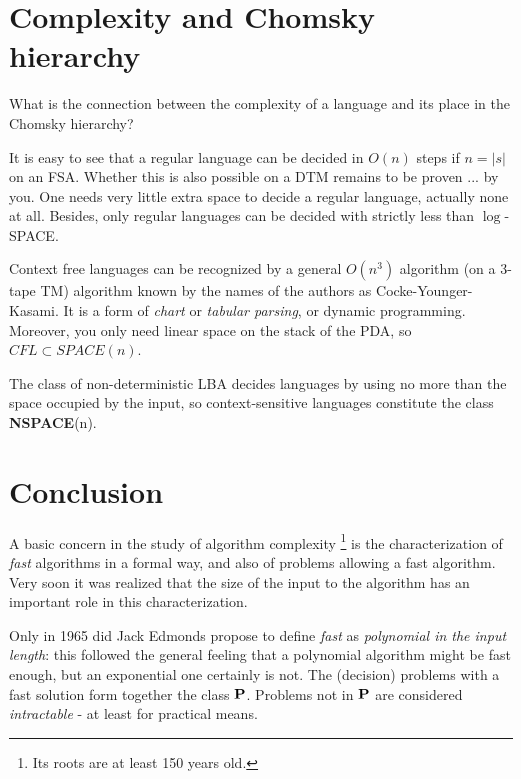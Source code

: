 \section{Complexity and Chomsky hierarchy}

What is the connection between the complexity of a language and its
place in the Chomsky hierarchy?

It is easy to see that a regular language can be decided in $O(n)$
steps if $n = |s|$ on an FSA. Whether this is also possible on a DTM
remains to be proven ... by you. One needs very little extra space to
decide a regular language, actually none at all. Besides, only regular
languages can be decided with strictly less than $\log$-SPACE.

Context free languages can be recognized by a general $O(n^3)$
algorithm (on a 3-tape TM) algorithm known by the names of the authors
as Cocke-Younger-Kasami. It is a form of {\em chart} or {\em tabular
  parsing}, or dynamic programming. Moreover, you only need linear space on the stack of the PDA, so $CFL \subset SPACE(n)$.

The class of non-deterministic LBA decides languages by using no more
than the space occupied by the input, so context-sensitive languages
constitute the class {\bf NSPACE}(n).


\section{Conclusion}

A basic concern in the study of algorithm complexity \footnote{Its
  roots are at least 150 years old.} is the characterization of {\em
  fast} algorithms in a formal way, and also of problems allowing a
fast algorithm. Very soon it was realized that the size of the input
to the algorithm has an important role in this characterization.

Only in 1965 did Jack Edmonds propose to define {\em fast} as {\em
  polynomial in the input length}: this followed the general feeling
that a polynomial algorithm might be fast enough, but an exponential
one certainly is not. The (decision) problems with a fast solution
form together the class $\P$. Problems not in $\P$ are considered {\em
  intractable} - at least for practical means.

